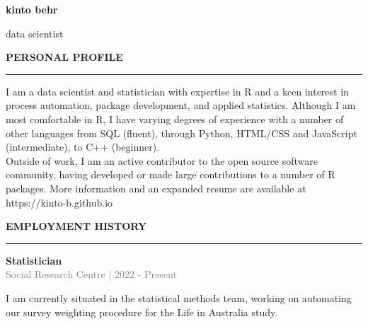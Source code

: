 \documentclass[12pt]{article}
\begin{document}
\lsstyle

\pagecolor{skyblue}

\newcommand{\stub}{\textcolor{skyblue}{\rule{3cm}{3mm}}}

\begin{huge}\begin{center}{\bf kinto behr}\end{center}\end{huge}
\begin{Large}\begin{center}{data scientist}\end{center}\end{Large}
\vspace{1cm}

\begin{large}
{\bf PERSONAL PROFILE} \\
\textcolor{gray}{\rule{2cm}{2mm}}
\end{large}
\vspace{5pt}

\begin{small}
I am a data scientist and statistician with expertise in R and a keen interest in process automation, package development, and applied statistics. Although I am most comfortable in R, I have varying degrees of experience with a number of other languages from SQL (fluent), through Python, HTML/CSS and JavaScript (intermediate), to C++ (beginner). \\

Outside of work, I am an active contributor to the open source software community, having developed or made large contributions to a number of R packages. More information and an expanded resume are available at https://kinto-b.github.io

\end{small}

\vspace{1cm}
\begin{large}
{\bf EMPLOYMENT HISTORY} \\
\textcolor{gray}{\rule{2cm}{2mm}}
\end{large}
\vspace{5pt}

{\bf Statistician} \\
\textcolor{gray}{Social Research Centre | 2022 - Present} \\[3pt]
\begin{small}
I am currently situated in the statistical methods team, working on automating our survey weighting procedure for the Life in Australia study.
\end{small}
\end{document}

